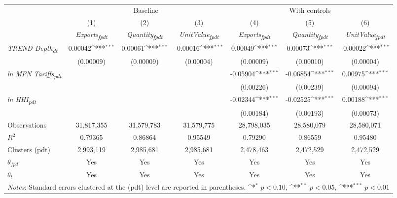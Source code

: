 {
\def\sym#1{\ifmmode^{#1}\else\(^{#1}\)\fi}
\begin{tabular}{l*{6}{c}}
\toprule
&\multicolumn{3}{c}{Baseline}&\multicolumn{3}{c}{With controls}\\\cmidrule(lr){2-4}\cmidrule(lr){5-7}
&(1)&(2)&(3)&(4)&(5)&(6)\\
&\textit{Exports\textsubscript{fpdt}}&\textit{Quantity\textsubscript{fpdt}}&\textit{UnitValue\textsubscript{fpdt}}&\textit{Exports\textsubscript{fpdt}}&\textit{Quantity\textsubscript{fpdt}}&\textit{UnitValue\textsubscript{fpdt}}\\
\midrule
\textit{TREND Depth\textsubscript{dt}} & 0.00042\sym{***} & 0.00061\sym{***} & -0.00016\sym{***} & 0.00049\sym{***} & 0.00073\sym{***} & -0.00022\sym{***}\\
 & (0.00009) & (0.00009) & (0.00004) & (0.00009) & (0.00010) & (0.00004)\\
\addlinespace
\textit{ln MFN Tariffs\textsubscript{pdt}} &  &  &  & -0.05904\sym{***} & -0.06854\sym{***} & 0.00975\sym{***}\\
 &  &  &  & (0.00226) & (0.00239) & (0.00094)\\
\addlinespace
\textit{ln HHI\textsubscript{pdt}} &  &  &  & -0.02344\sym{***} & -0.02525\sym{***} & 0.00188\sym{***}\\
 &  &  &  & (0.00184) & (0.00193) & (0.00073)\\
\midrule
Observations & 31,817,355 & 31,579,783 & 31,579,775 & 28,798,035 & 28,580,079 & 28,580,071\\
$R^{2}$ & 0.79365 & 0.86864 & 0.95549 & 0.79290 & 0.86559 & 0.95480\\
Clusters (pdt) & 2,993,119 & 2,985,681 & 2,985,681 & 2,478,463 & 2,472,529 & 2,472,529\\
$\theta_{fpd}$ & Yes & Yes & Yes & Yes & Yes & Yes\\
$\theta_{t}$ & Yes & Yes & Yes & Yes & Yes & Yes\\
\bottomrule
\multicolumn{7}{l}{\footnotesize \textit{Notes}: Standard errors clustered at the (pdt) level are reported in parentheses. \sym{*} \(p<0.10\), \sym{**} \(p<0.05\), \sym{***} \(p<0.01\)}\\
\end{tabular}
}
